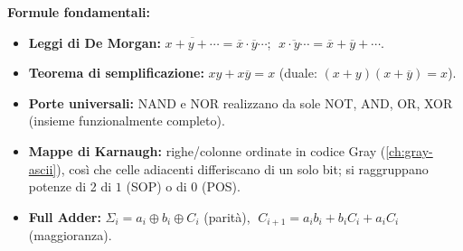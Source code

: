 \begin{note}
\textbf{Formule fondamentali:}
\begin{itemize}
    \item \textbf{Leggi di De Morgan:} $\overline{x+y+\cdots} = \overline{x}\cdot\overline{y}\cdots$; $\;\overline{x\cdot y \cdots} = \overline{x}+\overline{y}+\cdots$.
    \item \textbf{Teorema di semplificazione:} $xy+x\overline{y}=x$ (duale: $(x+y)(x+\overline{y})=x$).
    \item \textbf{Porte universali:} NAND e NOR realizzano da sole NOT, AND, OR, XOR (insieme funzionalmente completo).
    \item \textbf{Mappe di Karnaugh:} righe/colonne ordinate in codice Gray (\cref{ch:gray-ascii}), così che celle adiacenti differiscano di un solo bit; si raggruppano potenze di 2 di $1$ (SOP) o di $0$ (POS).
    \item \textbf{Full Adder:} $\Sigma_i = a_i\oplus b_i\oplus C_i$ (parità), $\; C_{i+1}=a_ib_i+b_iC_i+a_iC_i$ (maggioranza).
\end{itemize}
\end{note}

